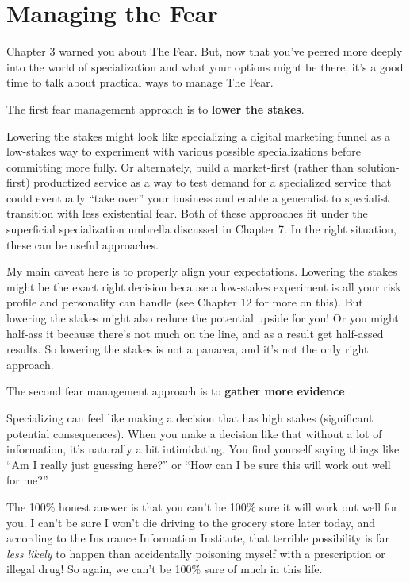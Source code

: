 \chapter{Managing the Fear}

Chapter 3 warned you about The Fear. But, now that you've peered more deeply into the world of specialization and what your options might be there, it's a good time to talk about practical ways to manage The Fear.

The first fear management approach is to \textbf{lower the stakes}.

Lowering the stakes might look like specializing a digital marketing funnel as a low-stakes way to experiment with various possible specializations before committing more fully. Or alternately, build a market-first (rather than solution-first) productized service as a way to test demand for a specialized service that could eventually ``take over'' your business and enable a generalist to specialist transition with less existential fear. Both of these approaches fit under the superficial specialization umbrella discussed in Chapter 7. In the right situation, these can be useful approaches.

My main caveat here is to properly align your expectations. Lowering the stakes might be the exact right decision because a low-stakes experiment is all your risk profile and personality can handle (see Chapter 12 for more on this). But lowering the stakes might also reduce the potential upside for you! Or you might half-ass it because there's not much on the line, and as a result get half-assed results. So lowering the stakes is not a panacea, and it's not the only right approach.

The second fear management approach is to \textbf{gather more evidence}

Specializing can feel like making a decision that has high stakes (significant potential consequences). When you make a decision like that without a lot of information, it's naturally a bit intimidating. You find yourself saying things like ``Am I really just guessing here?'' or ``How can I be sure this will work out well for me?''.

The 100\% honest answer is that you can't be 100\% sure it will work out well for you. I can't be sure I won't die driving to the grocery store later today, and according to the Insurance Information Institute, that terrible possibility is far \emph{less likely} to happen than accidentally poisoning myself with a prescription or illegal drug! So again, we can't be 100\% sure of much in this life.

